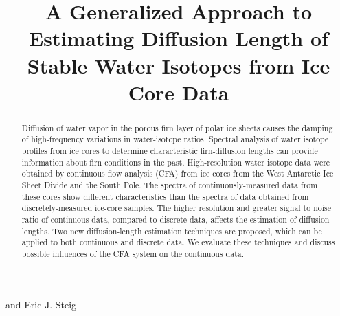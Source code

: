 \documentclass[draft, jgrga]{AGUTeX}
\begin{document}

\title{A Generalized Approach to Estimating Diffusion Length of Stable Water Isotopes from Ice Core Data}




 and Eric J. Steig






\begin{abstract}

Diffusion of water vapor in the porous firn layer of polar ice sheets causes the damping of high-frequency variations in water-isotope ratios. Spectral analysis of water isotope profiles from ice cores to determine characteristic firn-diffusion lengths can provide information about firn conditions in the past. High-resolution water isotope data were obtained by continuous flow analysis (CFA) from ice cores from the West Antarctic Ice Sheet Divide and the South Pole. The spectra of continuously-measured data from these cores show different characteristics than the spectra of data obtained from discretely-measured ice-core samples.  The higher resolution and greater signal to noise ratio of continuous data, compared to discrete data, affects the estimation of diffusion lengths. Two new diffusion-length estimation techniques are proposed, which can be applied to both continuous and discrete data. We evaluate these techniques and discuss possible influences of the CFA system on the continuous data.

\end{abstract}
\end{document}
